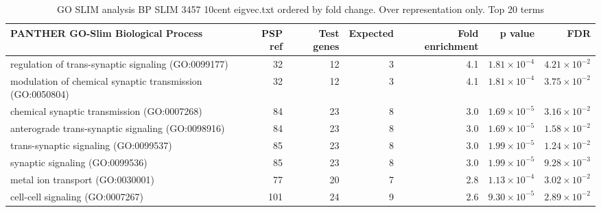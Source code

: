 \begin{table}[ht]
\centering
\begin{adjustbox}{width=\textwidth}

\begin{tabular}{lrrrrrr}
  \hline
PANTHER GO-Slim Biological Process & PSP ref & Test genes & Expected & Fold enrichment & p value & FDR \\ 
  \hline
regulation of trans-synaptic signaling (GO:0099177) & 32 & 12 & 3 & 4.1 & $1.81 \times 10^{-4}$ & $4.21 \times 10^{-2}$ \\ 
  modulation of chemical synaptic transmission (GO:0050804) & 32 & 12 & 3 & 4.1 & $1.81 \times 10^{-4}$ & $3.75 \times 10^{-2}$ \\ 
  chemical synaptic transmission (GO:0007268) & 84 & 23 & 8 & 3.0 & $1.69 \times 10^{-5}$ & $3.16 \times 10^{-2}$ \\ 
  anterograde trans-synaptic signaling (GO:0098916) & 84 & 23 & 8 & 3.0 & $1.69 \times 10^{-5}$ & $1.58 \times 10^{-2}$ \\ 
  trans-synaptic signaling (GO:0099537) & 85 & 23 & 8 & 3.0 & $1.99 \times 10^{-5}$ & $1.24 \times 10^{-2}$ \\ 
  synaptic signaling (GO:0099536) & 85 & 23 & 8 & 3.0 & $1.99 \times 10^{-5}$ & $9.28 \times 10^{-3}$ \\ 
  metal ion transport (GO:0030001) & 77 & 20 & 7 & 2.8 & $1.13 \times 10^{-4}$ & $3.02 \times 10^{-2}$ \\ 
  cell-cell signaling (GO:0007267) & 101 & 24 & 9 & 2.6 & $9.30 \times 10^{-5}$ & $2.89 \times 10^{-2}$ \\ 
   \hline
\end{tabular}
\end{adjustbox}
\caption{GO SLIM analysis BP SLIM 3457 10cent eigvec.txt ordered by fold change. Over representation only. Top 20 terms} 
\label{tab:GO SLIM analysis BP SLIM 3457 10cent eigvec.txt ordered by fold change. Over representation only. Top 20 terms}
\end{table}


